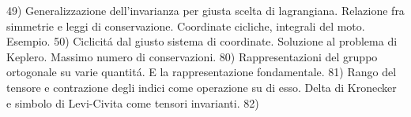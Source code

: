 \begin{multicols}{3}
  49) Generalizzazione dell'invarianza per giusta scelta di lagrangiana.
  Relazione fra simmetrie e leggi di conservazione. Coordinate cicliche,
  integrali del moto. Esempio.
  50) Ciclicit\'a dal giusto sistema di coordinate. Soluzione al problema di
  Keplero. Massimo numero di conservazioni.
  80) Rappresentazioni del gruppo ortogonale su varie quantit\'a. E la
  rappresentazione fondamentale.
  81) Rango del tensore e contrazione degli indici come operazione su di esso.
  Delta di Kronecker e simbolo di Levi-Civita come tensori invarianti.
  82) 

\end{multicols}

